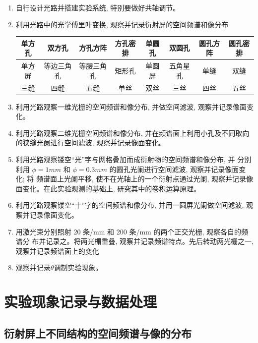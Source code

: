 \documentclass[12pt]{article}
\numberwithin{equation}{section}
\numberwithin{figure}{section}
\begin{document}
\begin{enumerate} 

    \item 自行设计光路并搭建实验系统, 特别要做好共轴调节。
    \item 利用光路中的光学傅里叶变换, 观察并记录衍射屏的空间频谱和像分布
    
    \begin{tabular}{|c|c|c|c|c|c|c|c|}
        \hline
        单方孔 & 双方孔 & 方孔方阵 & 方孔密排 & 单圆孔 & 双圆孔 & 圆孔方阵 & 圆孔密排 \\
        \hline
        单方屏 & 等边三角孔 & 等腰三角孔 & 矩形孔 & 单圆屏 & 五角星孔 & 单缝 & 双缝 \\
        \hline
        三缝 & 四缝 & 五缝 & 单丝 & 双丝 & 三丝 & 四丝 & 五丝 \\
        \hline
    \end{tabular}

    \item 利用光路观察一维光栅的空间频谱和像分布, 并做空间滤波, 观察并记录像面变化。
    \item 利用光路观察二维光栅空间频谱和像分布, 并在频谱面上利用小孔及不同取向的狭缝光阑进行空间滤波, 观察并记录像面变化。
    \item 利用光路观察镂空“光”字与网格叠加而成衍射物的空间频谱和像分布, 并
    分别利用 $\phi=1mm$ 和 $\phi=0.3mm$ 的圆孔光阑进行空间滤波, 观察并记录像面变化; 将
    频谱面上光阑平移, 使不在光轴上的一个衍射点通过光阑, 观察并记录像面变化。在此实验观测的基础上, 研究其中的卷积运算原理。
    \item 利用光路观察镂空“十”字的空间频谱和像分布, 并用一圆屏光阑做空间滤波, 观察并记录像面变化。
    \item 用激光束分别照射 20 条/mm 和 200 条/mm 的两个正交光栅, 观察各自的频谱分
    布并记录之。将两光栅重叠, 观察并记录频谱特点。先后转动两光栅之一, 观察并记录频谱面上的变化
    \item 观察并记录$\theta$调制实验现象。

\end{enumerate}

\section{实验现象记录与数据处理}

\subsection{衍射屏上不同结构的空间频谱与像的分布}
\end{document}
